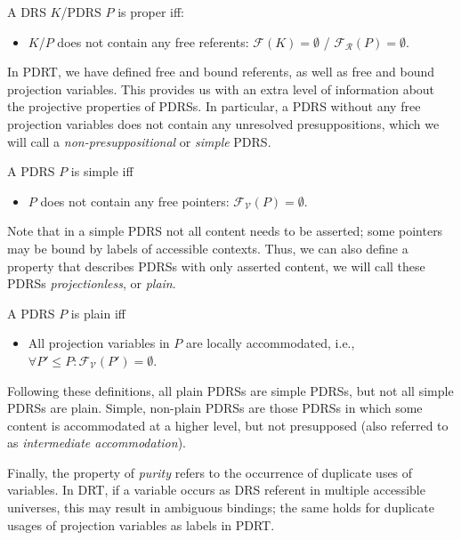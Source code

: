 \begin{definition}[Properness]
A DRS $K$/PDRS $P$ is proper iff:
\begin{itemize}
  \item $K$/$P$ does not contain any free referents: 
    $\mathcal{F}(K) = \emptyset$ / $\mathcal{F_R}(P) = \emptyset$.
\end{itemize}
\end{definition}

In PDRT, we have defined free and bound referents, as well as free and bound
projection variables. This provides us with an extra level of information
about the projective properties of PDRSs. In particular, a PDRS without any
free projection variables does not contain any unresolved presuppositions,
which we will call a \textit{non-presuppositional} or \textit{simple} PDRS.

\begin{definition}[Simpleness]
A PDRS $P$ is simple iff
\begin{itemize}
  \item $P$ does not contain any free pointers: $\mathcal{F_V}(P) = \emptyset$.
\end{itemize}
\end{definition}

\noindent Note that in a simple PDRS not all content needs to be asserted;
some pointers may be bound by labels of accessible contexts. Thus, we can
also define a property that describes PDRSs with only asserted content, we
will call these PDRSs \textit{projectionless}, or \textit{plain}.

\begin{definition}[Plainness]
A PDRS $P$ is plain iff
\begin{itemize}
  \item All projection variables in $P$ are locally accommodated, i.e.,
    $\forall P' \leq P: \mathcal{F_V}(P') = \emptyset$.
\end{itemize}
\end{definition}

\noindent Following these definitions, all plain PDRSs are simple PDRSs, but
not all simple PDRSs are plain. Simple, non-plain PDRSs are those PDRSs in
which some content is accommodated at a higher level, but not presupposed
(also referred to as \textit{intermediate accommodation}).

Finally, the property of \emph{purity} refers to the occurrence of duplicate
uses of variables. In DRT, if a variable occurs as DRS referent in multiple
accessible universes, this may result in ambiguous bindings; the same holds
for duplicate usages of projection variables as labels in PDRT.

